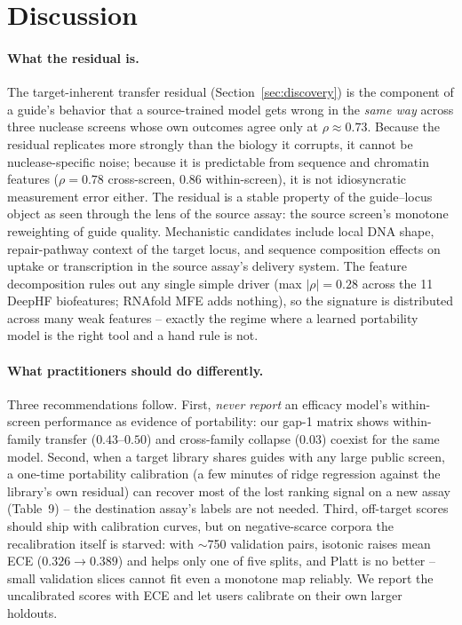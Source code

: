 \section{Discussion}
\label{sec:discussion}

\paragraph{What the residual is.}
The target-inherent transfer residual (Section~\ref{sec:discovery}) is the
component of a guide's behavior that a source-trained model gets wrong in
the \emph{same way} across three nuclease screens whose own outcomes agree
only at $\rho \approx 0.73$. Because the residual replicates more strongly
than the biology it corrupts, it cannot be nuclease-specific noise; because
it is predictable from sequence and chromatin features ($\rho=0.78$
cross-screen, $0.86$ within-screen), it is not idiosyncratic measurement
error either. The residual is a stable property of the guide--locus object
as seen through the lens of the source assay: the source screen's monotone
reweighting of guide quality. Mechanistic candidates include local DNA
shape, repair-pathway context of the target locus, and sequence
composition effects on uptake or transcription in the source assay's
delivery system. The feature decomposition rules out any single simple
driver (max $|\rho|=0.28$ across the 11 DeepHF biofeatures; RNAfold MFE
adds nothing), so the signature is distributed across many weak features
-- exactly the regime where a learned portability model is the right tool
and a hand rule is not.

\paragraph{What practitioners should do differently.}
Three recommendations follow. First, \emph{never report} an efficacy
model's within-screen performance as evidence of portability: our gap-1
matrix shows within-family transfer ($0.43$--$0.50$) and cross-family
collapse ($0.03$) coexist for the same model. Second, when a target
library shares guides with any large public screen, a one-time
portability calibration (a few minutes of ridge regression against the
library's own residual) can recover most of the lost ranking signal on a
new assay (Table~9) -- the destination assay's labels are not needed.
Third, off-target scores should ship with calibration curves, but on
negative-scarce corpora the recalibration itself is starved: with
${\sim}$750 validation pairs, isotonic raises mean ECE ($0.326 \to
0.389$) and helps only one of five splits, and Platt is no better --
small validation slices cannot fit even a monotone map reliably. We
report the uncalibrated scores with ECE and let users calibrate on their
own larger holdouts.


